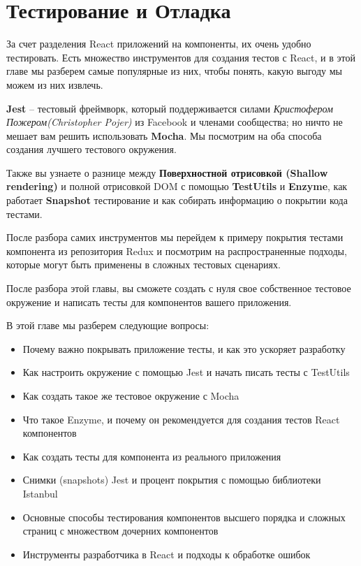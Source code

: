 \chapter{Тестирование и Отладка}

За счет разделения React приложений на компоненты, их очень удобно тестировать. Есть множество инструментов для создания тестов с React, и в этой главе мы разберем самые популярные из них, чтобы понять, какую выгоду мы можем из них извлечь.

\textbf{Jest} -- тестовый фреймворк, который поддерживается силами \textit{Кристофером Пожером(Christopher Pojer)} из Facebook и членами сообщества; но ничто не мешает вам решить использовать \textbf{Mocha}. Мы посмотрим на оба способа создания лучшего тестового окружения.

Также вы узнаете о разнице между \textbf{Поверхностной отрисовкой (Shallow rendering)} и полной отрисовкой DOM с помощью \textbf{TestUtils} и \textbf{Enzyme}, как работает \textbf{Snapshot} тестирование и как собирать информацию о покрытии кода тестами.

После разбора самих инструментов мы перейдем к примеру покрытия тестами компонента из репозитория Redux и посмотрим на распространенные подходы, которые могут быть применены в сложных тестовых сценариях.

После разбора этой главы, вы сможете создать с нуля свое собственное тестовое окружение и написать тесты для компонентов вашего приложения.

В этой главе мы разберем следующие вопросы:

\begin{itemize}
	\item Почему важно покрывать приложение тесты, и как это ускоряет разработку
	\item Как настроить окружение с помощью Jest и начать писать тесты с TestUtils
	\item Как создать такое же тестовое окружение с Mocha
	\item Что такое Enzyme, и почему он рекомендуется для создания тестов React компонентов
	\item Как создать тесты для компонента из реального приложения
	\item Снимки (snapshots) Jest и процент покрытия с помощью библиотеки Istanbul
	\item Основные способы тестирования компонентов высшего порядка и сложных страниц с множеством дочерних компонентов
	\item Инструменты разработчика в React и подходы к обработке ошибок
\end{itemize}

